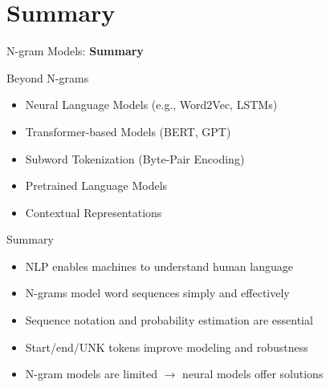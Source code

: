 \section{Summary}
\begin{frame}{}
    \LARGE N-gram Models: \textbf{Summary}
\end{frame}

\begin{frame}{Beyond N-grams}
    \begin{itemize}
        \item Neural Language Models (e.g., Word2Vec, LSTMs)
        \item Transformer-based Models (BERT, GPT)
        \item Subword Tokenization (Byte-Pair Encoding)
        \item Pretrained Language Models
        \item Contextual Representations
    \end{itemize}
\end{frame}

\begin{frame}{Summary}
    \begin{itemize}
        \item NLP enables machines to understand human language
        \item N-grams model word sequences simply and effectively
        \item Sequence notation and probability estimation are essential
        \item Start/end/UNK tokens improve modeling and robustness
        \item N-gram models are limited $\rightarrow$ neural models offer solutions
    \end{itemize}
\end{frame}